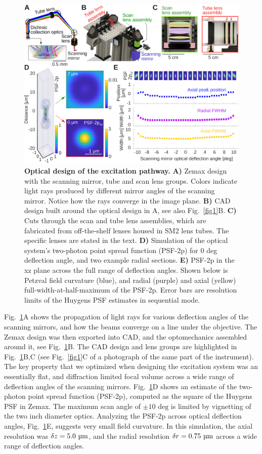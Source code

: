 \documentclass[10pt,letterpaper]{article}
\begin{document}
\begin{figure}[!t]
    \includegraphics[width=\textwidth]{fig2.jpg}
    \caption{{\bf Optical design of the excitation pathway.} \textbf{A)} Zemax design with the scanning mirror, tube and scan lens groups. Colors indicate light rays produced by different mirror angles of the scanning mirror. Notice how the rays converge in the image plane. \textbf{B)} CAD design built around the optical design in A, see also Fig.~\ref{fig1}B. \textbf{C)} Cuts through the scan and tube lens assemblies, which are fabricated from off-the-shelf lenses housed in SM2 lens tubes. The specific lenses are stated in the text. \textbf{D)} Simulation of the optical system's two-photon point spread function (PSF-2p) for 0 deg deflection angle, and two example radial sections. \textbf{E)} PSF-2p in the xz plane across the full range of deflection angles. Shown below is Petzval field curvature (blue), and radial (purple) and axial (yellow) full-width-at-half-maximum of the PSF-2p. Error bars are resolution limits of the Huygens PSF estimates in sequential mode.}
    \label{fig2}
\end{figure}
%
Fig.~\ref{fig2}A shows the propagation of light rays for various deflection angles of the scanning mirrors, and how the beams converge on a line under the objective. The Zemax design was then exported into CAD, and the optomechanics assembled around it, see Fig.~\ref{fig2}B. The CAD design and lens groups are highlighted in Fig.~\ref{fig2}B,C (see Fig.~\ref{fig1}C of a photograph of the same part of the instrument). The key property that we optimized when designing the excitation system was an essentially flat, and diffraction limited focal volume across a wide range of deflection angles of the scanning mirrors. Fig.~\ref{fig2}D shows an estimate of the two-photon point spread function (PSF-2p), computed as the square of the Huygens PSF in Zemax. The maximum scan angle of $\pm 10\text{ deg}$ is limited by vignetting of the two inch diameter optics. Analyzing the PSF-2p across optical deflection angles, Fig.~\ref{fig2}E, suggests very small field curvature. In this simulation, the axial resolution was $\delta z = 5.0\text{ \textmu m}$, and the radial resolution $\delta r = 0.75\text{ \textmu m}$ across a wide range of deflection angles.\newline
\end{document}

